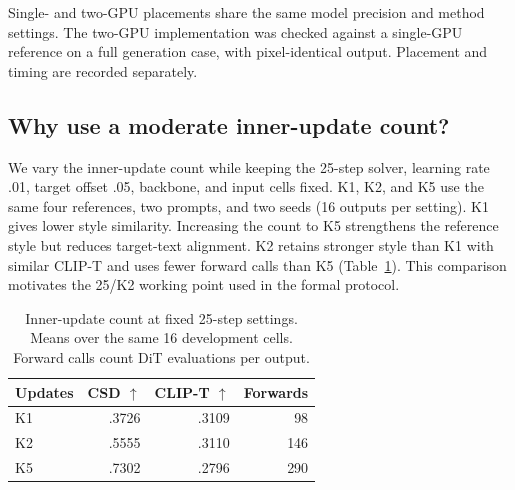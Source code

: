 Single- and two-GPU placements share the same model precision and method
settings. The two-GPU implementation was checked against a single-GPU
reference on a full generation case, with pixel-identical output. Placement
and timing are recorded separately.

\begin{table}[t]
\centering\small
\caption{Complete development search: 25 configurations, each with four
references, two prompts, and two seeds (16 outputs). ``Four nodes'' denotes
one update at each common intervention node. ``+nodes'' denotes node
insertion into the nominal solver. Labels map to experiment identifiers in
the source records.}
\label{tab:searchcomplete}

\end{table}

\begin{table}[t]
\centering\small
\caption{Expanded development comparison: seven settings on eight
references, six prompts, and seed 64 (48 outputs per row).}
\label{tab:coveragecomplete}
\resizebox{\columnwidth}{!}{}
\end{table}

\subsection{Why use a moderate inner-update count?}
We vary the inner-update count while keeping the 25-step solver, learning
rate .01, target offset .05, backbone, and input cells fixed. K1, K2, and
K5 use the same four references, two prompts, and two seeds (16 outputs
per setting). K1 gives lower style similarity. Increasing the count to K5
strengthens the reference style but reduces target-text alignment. K2
retains stronger style than K1 with similar CLIP-T and uses fewer forward
calls than K5 (Table~\ref{tab:densitychoice}). This comparison motivates the
25/K2 working point used in the formal protocol.

\begin{table}[t]
\centering\small
\caption{Inner-update count at fixed 25-step settings. Means over the same
16 development cells. Forward calls count DiT evaluations per output.}
\label{tab:densitychoice}
\begin{tabular}{lrrr}
\toprule
Updates & CSD $\uparrow$ & CLIP-T $\uparrow$ & Forwards \\
\midrule
K1 & .3726 & .3109 & 98 \\
K2 & .5555 & .3110 & 146 \\
K5 & .7302 & .2796 & 290 \\
\bottomrule
\end{tabular}
\end{table}

